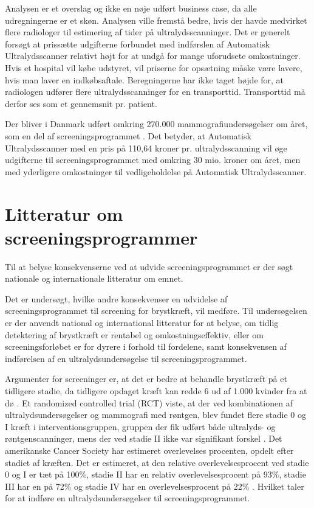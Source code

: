 Analysen er et overslag og ikke en nøje udført business case, da alle udregningerne er et skøn. Analysen ville fremstå bedre, hvis der havde medvirket flere radiologer til estimering af tider på ultralydsscanninger. Det er generelt forsøgt at prissætte udgifterne forbundet med indførslen af Automatisk Ultralydsscanner relativt højt for at undgå for mange uforudsete omkostninger. Hvis et hospital vil købe udstyret, vil priserne for opsætning måske være lavere, hvis man laver en indkøbsaftale. Beregningerne har ikke taget højde for, at radiologen udfører flere ultralydsscanninger for en transporttid. Transporttid må derfor ses som et gennemsnit pr. patient.

Der bliver i Danmark udført omkring 270.000 mammografiundersøgelser om året, som en del af screeningsprogrammet \cite{esundhed}. Det betyder, at Automatisk Ultralydsscanner med en pris på 110,64 kroner pr. ultralydsscanning vil øge udgifterne til screeningsprogrammet med omkring 30 mio. kroner om året, men med yderligere omkostninger til vedligeholdelse på Automatisk Ultralydsscanner. 

\section{Litteratur om screeningsprogrammer} 
Til at belyse konsekvenserne ved at udvide screeningsprogrammet er der søgt nationale og internationale litteratur om emnet. 

Det er undersøgt, hvilke andre konsekvenser en udvidelse af screeningsprogrammet til screening for brystkræft, vil medføre. Til undersøgelsen er der anvendt national og international litteratur for at belyse, om tidlig detektering af brystkræft er rentabel og omkostningseffektiv, eller om screeningsforløbet er for dyrere i forhold til fordelene, samt konsekvensen af indførelsen af en ultralydsundersøgelse til screeningsprogrammet. 

Argumenter for screeninger er, at det er bedre at behandle brystkræft på et tidligere stadie, da tidligere opdaget kræft kan redde 6 ud af 1.000 kvinder fra at dø \cite{Argumenter}. Et randomized controlled trial (RCT) viste, at der ved kombinationen af ultralydsundersøgelser og mammografi med røntgen, blev fundet flere stadie 0 og I kræft i interventionsgruppen, gruppen der fik udført både ultralyds- og røntgenscanninger, mens der ved stadie II ikke var signifikant forskel \cite{Japan}. Det amerikanske Cancer Society har estimeret overlevelses procenten, opdelt efter stadiet af kræften. Det er estimeret, at den relative overlevelsesprocent ved stadie 0 og I er tæt på 100\%, stadie II har en relativ overlevelsesprocent på 93\%, stadie III har en på 72\% og stadie IV har en overlevelsesprocent på 22\% \cite{CancerSociety}. Hvilket taler for at indføre en ultralydsundersøgelser til screeningsprogrammet. 


